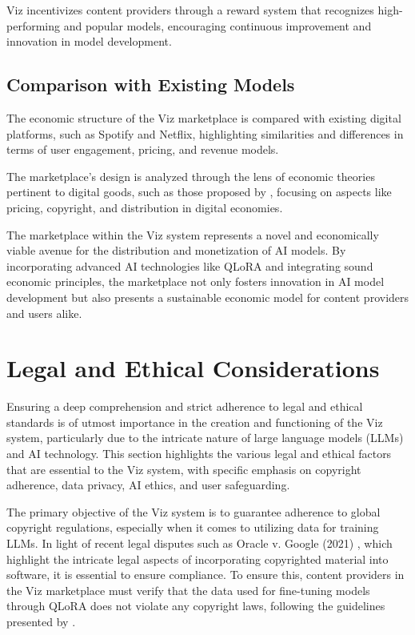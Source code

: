 \documentclass{article}
\begin{document}
Viz incentivizes content providers through a reward system that recognizes high-performing and popular models, encouraging continuous improvement and innovation in model development.

\subsection{Comparison with Existing Models}
The economic structure of the Viz marketplace is compared with existing digital platforms, such as Spotify and Netflix, highlighting similarities and differences in terms of user engagement, pricing, and revenue models.

The marketplace's design is analyzed through the lens of economic theories pertinent to digital goods, such as those proposed by \cite{varian1995pricing}, focusing on aspects like pricing, copyright, and distribution in digital economies.

The marketplace within the Viz system represents a novel and economically viable avenue for the distribution and monetization of AI models. By incorporating advanced AI technologies like QLoRA and integrating sound economic principles, the marketplace not only fosters innovation in AI model development but also presents a sustainable economic model for content providers and users alike.

\section{Legal and Ethical Considerations}

Ensuring a deep comprehension and strict adherence to legal and ethical standards is of utmost importance in the creation and functioning of the Viz system, particularly due to the intricate nature of large language models (LLMs) and AI technology. This section highlights the various legal and ethical factors that are essential to the Viz system, with specific emphasis on copyright adherence, data privacy, AI ethics, and user safeguarding.

The primary objective of the Viz system is to guarantee adherence to global copyright regulations, especially when it comes to utilizing data for training LLMs. In light of recent legal disputes such as Oracle v. Google (2021) \citep{enwiki:1187395454}, which highlight the intricate legal aspects of incorporating copyrighted material into software, it is essential to ensure compliance. To ensure this, content providers in the Viz marketplace must verify that the data used for fine-tuning models through QLoRA does not violate any copyright laws, following the guidelines presented by \cite{GaonAviv2021Tfoc}.
\end{document}
